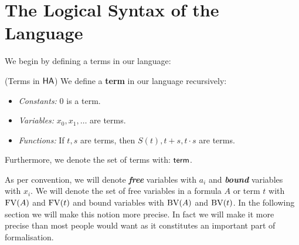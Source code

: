 \chapter{The Logical Syntax of the Language}

We begin by defining a terms in our language:
\begin{cthdefinition}{(Terms in $\textsf{HA}$)}
    We define a \textbf{term} in our language recursively:
    \begin{itemize}[noitemsep]
        \item \emph{Constants:} $0$ is a term.
        \item \emph{Variables:} $x_0, x_1, \dots$ are terms.
        \item \emph{Functions:} If $t, s$ are terms, then $S(t), t+s, t\cdot s$ are terms.
    \end{itemize}
    Furthermore, we denote the set of terms with: $\textsf{term}$.
\end{cthdefinition}
As per convention, we will denote \textbf{\emph{free}} variables with $a_i$ and \textbf{\emph{bound}} variables with $x_i$. We will denote the set of free variables in a formula $A$ or term $t$ with $\operatorname{FV}(A)$ and $\operatorname{FV}(t)$ and bound variables with $\operatorname{BV}(A)$ and $\operatorname{BV}(t)$. In the following section we will make this notion more precise. In fact we will make it more precise than most people would want as it constitutes an important part of formalisation.

